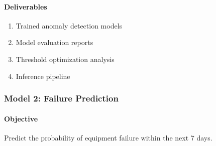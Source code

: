 \documentclass[12pt,a4paper]{article}
\begin{document}
\paragraph{Deliverables}
\begin{enumerate}
    \item Trained anomaly detection models
    \item Model evaluation reports
    \item Threshold optimization analysis
    \item Inference pipeline
\end{enumerate}

\subsubsection{Model 2: Failure Prediction}

\paragraph{Objective}
Predict the probability of equipment failure within the next 7 days.
\end{document}
